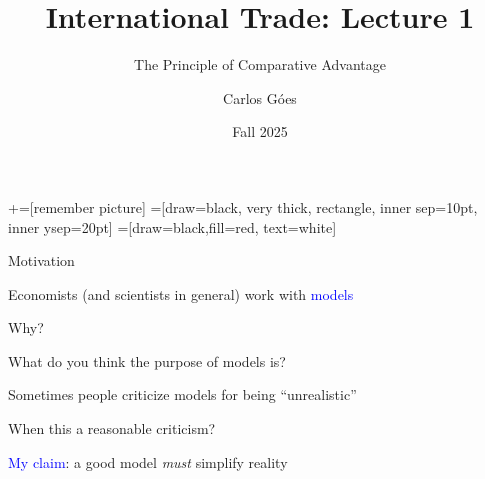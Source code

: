 \documentclass[notes,11pt, aspectratio=169, xcolor=table]{beamer}
\title[]{International Trade: Lecture 1}
\subtitle[]{The Principle of Comparative Advantage}
\author[Góes]
{Carlos Góes\inst{1}}
\date{Fall 2025}
\institute[GWU]{\inst{1} George Washington University }
\newcommand{\blue}[1]{\textcolor{blue}{#1}}
\newenvironment{wideitemize}{\itemize\addtolength{\itemsep}{10pt}}{\enditemize}
\begin{document}
\newcommand\marktopleft[1]{%
    \tikz[overlay,remember picture] 
        \node (marker-#1-a) at (-.3em,.3em) {};%
}
\newcommand\markbottomright[2]{%
    \tikz[overlay,remember picture] 
        \node (marker-#1-b) at (0em,0em) {};%
}
+=[remember picture] 
 =[draw=black, very thick, rectangle, inner sep=10pt, inner ysep=20pt]
 =[draw=black,fill=red, text=white]















\frame{\titlepage}
\addtocounter{framenumber}{-1}




\begin{frame}{Motivation}

\begin{wideitemize}
    \item Economists (and scientists in general) work with \blue{models}
    \item<2-> Why?
    \item<2-> What do you think the purpose of models is?
    \item<3-> Sometimes people criticize models for being ``unrealistic''
    \item<4-> When this a reasonable criticism?
    \item<5-> \blue{My claim}: a good model \textit{must} simplify reality
\end{wideitemize}
    
\end{frame}
\end{document}
